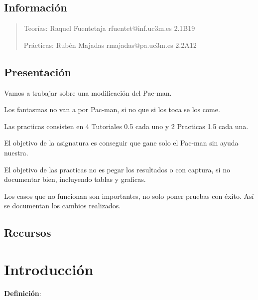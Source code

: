 \documentclass[12pt]{report} %
\begin{document}
\listoffigures
\thispagestyle{fancy}

\listoftables
\thispagestyle{fancy}

\clearpage
{} %




\section{Información}

\begin{quote}
Teorías: Raquel Fuentetaja rfuentet@inf.uc3m.es 2.1B19

Prácticas: Rubén Majadas rmajadas@pa.uc3m.es 2.2A12
\end{quote}

\section{Presentación}

Vamos a trabajar sobre una modificación del Pac-man.

Los fantasmas no van a por Pac-man, si no que si los toca se los come.

Las practicas consisten en 4 Tutoriales 0.5 cada uno y 2 Practicas 1.5
cada una.

El objetivo de la asignatura es conseguir que gane solo el Pac-man sin
ayuda nuestra.

El objetivo de las practicas no es pegar los resultados o con captura,
si no documentar bien, incluyendo tablas y graficas.

Los casos que no funcionan son importantes, no solo poner pruebas con
éxito. Así se documentan los cambios realizados.

\section{Recursos}

\chapter{Introducción}

\textbf{Definición}:
\end{document}
